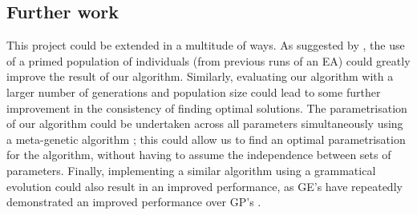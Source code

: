 \documentclass[british,10pt,a4paper]{article}
\begin{document}
\subsection{Further work}
This project could be extended in a multitude of ways. As suggested by \citet{Ehlis2000-sz}, the use of a primed population of individuals (from previous runs of an EA) could greatly improve the result of our algorithm. Similarly, evaluating our algorithm with a larger number of generations and population size could lead to some further improvement in the consistency of finding optimal solutions. The parametrisation of our algorithm could be undertaken across all parameters simultaneously using a meta-genetic algorithm \cite{Brain2011-pz}; this could allow us to find an optimal parametrisation for the algorithm, without having to assume the independence between sets of parameters. Finally, implementing a similar algorithm using a grammatical evolution could also result in an improved performance, as GE's have repeatedly demonstrated an improved performance over GP's \cite{Michael_ONeill1999-zi}.


\clearpage
\end{document}
